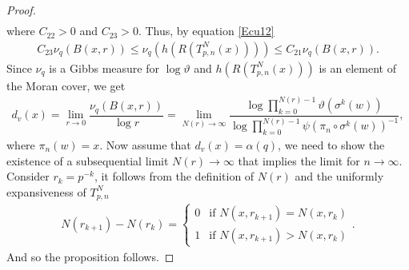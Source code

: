 \documentclass[11pt]{amsart}
\theoremstyle{remark}
\numberwithin{equation}{section}
\begin{document}
\begin{proof}
\begin{align*}
\end{align*}where $C_{22}>0$ and $C_{23}>0$. Thus, by equation \eqref{Ecu12} 
\begin{align*}
    C_{23}\nu_{q}(B(x,r))\leq \nu_{q}(h(R(T^{N}_{p,n}(x)))) \leq  C_{21}\nu_{q}(B(x,r)).
\end{align*}Since $\nu_{q}$ is a Gibbs measure for $\log \vartheta$ and $h(R(T^{N}_{p,n}(x)))$ is an element of the Moran cover, we get
\begin{align*}
    d_{v}(x)=\lim_{r\to 0}\dfrac{\nu_{q}(B(x,r))}{\log r}=\lim_{N(r)\to \infty}\dfrac{\log\prod^{N(r)-1}_{k=0}\vartheta(\sigma^{k}(w))}{\log \prod^{N(r)-1}_{k=0}\psi (\pi_{n}\circ \sigma^{k}(w))^{-1}},
\end{align*}where $\pi_{n}(w)=x$. Now assume that $d_{v}(x)=\alpha(q)$, we need to show the existence of a subsequential limit $N(r)\to \infty$ that implies the limit for $n\to \infty$.  Consider $r_{k}=p^{-k}$, it follows from the definition of $N(r)$ and the uniformly expansiveness of $T^{N}_{p,n}$
\begin{align*}
    N(r_{k+1})-N(r_{k})=\begin{cases}
        0 & \text{if $N(x,r_{k+1})=N(x,r_{k})$}\\
        1 & \text{if $N(x,r_{k+1})>N(x,r_{k})$}
    \end{cases}.
\end{align*}
And so the proposition follows. %
\end{proof}
\end{document}
